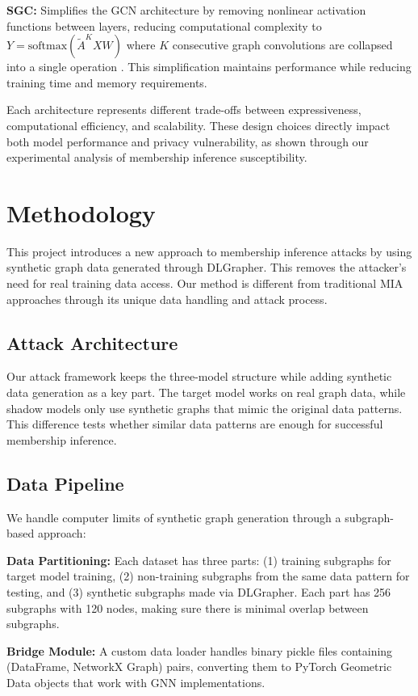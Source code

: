 \documentclass{article}
\begin{document}
\textbf{SGC:} Simplifies the GCN architecture by removing nonlinear activation functions between layers, reducing computational complexity to $Y = \text{softmax}(\tilde{A}^KXW)$ where $K$ consecutive graph convolutions are collapsed into a single operation \cite{wu2019simplifying}. This simplification maintains performance while reducing training time and memory requirements.

Each architecture represents different trade-offs between expressiveness, computational efficiency, and scalability. These design choices directly impact both model performance and privacy vulnerability, as shown through our experimental analysis of membership inference susceptibility.

\section{Methodology}
This project introduces a new approach to membership inference attacks by using synthetic graph data generated through DLGrapher. This removes the attacker's need for real training data access. Our method is different from traditional MIA approaches through its unique data handling and attack process.

\subsection{Attack Architecture}
Our attack framework keeps the three-model structure while adding synthetic data generation as a key part. The target model works on real graph data, while shadow models only use synthetic graphs that mimic the original data patterns. This difference tests whether similar data patterns are enough for successful membership inference.

\subsection{Data Pipeline}
We handle computer limits of synthetic graph generation through a subgraph-based approach:

\textbf{Data Partitioning:} Each dataset has three parts: (1) training subgraphs for target model training, (2) non-training subgraphs from the same data pattern for testing, and (3) synthetic subgraphs made via DLGrapher. Each part has 256 subgraphs with 120 nodes, making sure there is minimal overlap between subgraphs.

\textbf{Bridge Module:} A custom data loader handles binary pickle files containing (DataFrame, NetworkX Graph) pairs, converting them to PyTorch Geometric Data objects that work with GNN implementations.
\end{document}

